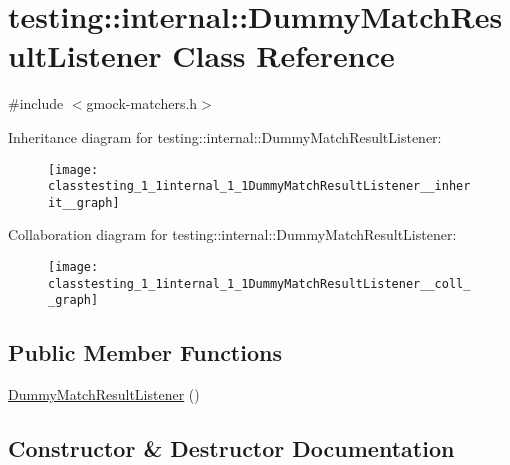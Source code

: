 \hypertarget{classtesting_1_1internal_1_1DummyMatchResultListener}{}\section{testing\+:\+:internal\+:\+:Dummy\+Match\+Result\+Listener Class Reference}
\label{classtesting_1_1internal_1_1DummyMatchResultListener}


{\ttfamily \#include $<$gmock-\/matchers.\+h$>$}



Inheritance diagram for testing\+:\+:internal\+:\+:Dummy\+Match\+Result\+Listener\+:
\nopagebreak
\begin{figure}[H]
\begin{center}
\leavevmode
\texttt{[image: classtesting\_1\_1internal\_1\_1DummyMatchResultListener\_\_inherit\_\_graph]}
\end{center}
\end{figure}


Collaboration diagram for testing\+:\+:internal\+:\+:Dummy\+Match\+Result\+Listener\+:
\nopagebreak
\begin{figure}[H]
\begin{center}
\leavevmode
\texttt{[image: classtesting\_1\_1internal\_1\_1DummyMatchResultListener\_\_coll\_\_graph]}
\end{center}
\end{figure}
\subsection*{Public Member Functions}
\begin{DoxyCompactItemize}
\item 
\hyperlink{classtesting_1_1internal_1_1DummyMatchResultListener_a3284ab25167628be9a92e4ee5d2042fe}{Dummy\+Match\+Result\+Listener} ()
\end{DoxyCompactItemize}


\subsection{Constructor \& Destructor Documentation}
